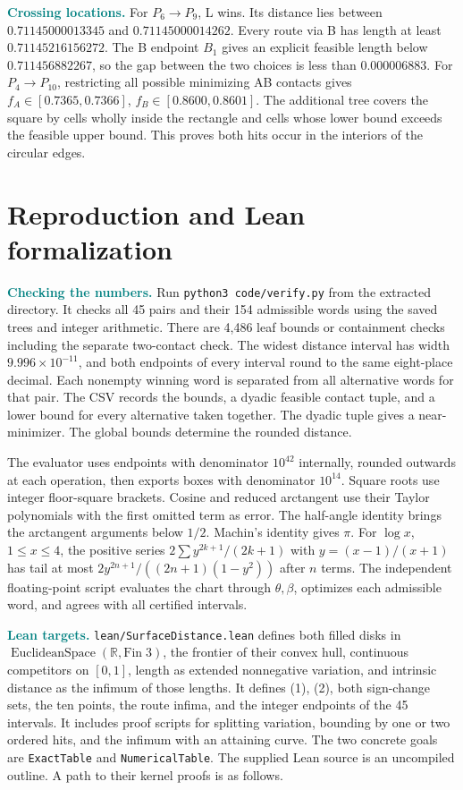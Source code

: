 \documentclass[11pt,letterpaper]{article}
\newcommand{\heading}[1]{\section*{\color{ink}#1}}
\newcommand{\para}[1]{\smallskip\noindent\textcolor{teal}{\textbf{#1}}\enspace}
\newcommand{\RR}{\mathbb R}
\begin{document}
\para{Crossing locations.} For $P_6\to P_9$, L wins. Its distance lies between $0.71145000013345$ and $0.71145000014262$. Every route via B has length at least $0.71145216156272$. The B endpoint $B_1$ gives an explicit feasible length below $0.711456882267$, so the gap between the two choices is less than $0.000006883$. For $P_4\to P_{10}$, restricting all possible minimizing AB contacts gives $f_A\in[0.7365,0.7366]$, $f_B\in[0.8600,0.8601]$. The additional tree covers the square by cells wholly inside the rectangle and cells whose lower bound exceeds the feasible upper bound. This proves both hits occur in the interiors of the circular edges.

\newpage
\heading{Reproduction and Lean formalization}
\para{Checking the numbers.} Run \texttt{python3 code/verify.py} from the extracted directory. It checks all 45 pairs and their 154 admissible words using the saved trees and integer arithmetic. There are 4{,}486 leaf bounds or containment checks including the separate two-contact check. The widest distance interval has width $9.996\times10^{-11}$, and both endpoints of every interval round to the same eight-place decimal. Each nonempty winning word is separated from all alternative words for that pair. The CSV records the bounds, a dyadic feasible contact tuple, and a lower bound for every alternative taken together. The dyadic tuple gives a near-minimizer. The global bounds determine the rounded distance.

The evaluator uses endpoints with denominator $10^{42}$ internally, rounded outwards at each operation, then exports boxes with denominator $10^{14}$. Square roots use integer floor-square brackets. Cosine and reduced arctangent use their Taylor polynomials with the first omitted term as error. The half-angle identity brings the arctangent arguments below $1/2$. Machin's identity gives $\pi$. For $\log x$, $1\le x\le4$, the positive series $2\sum y^{2k+1}/(2k+1)$ with $y=(x-1)/(x+1)$ has tail at most $2y^{2n+1}/((2n+1)(1-y^2))$ after $n$ terms. The independent floating-point script evaluates the chart through $\theta,\beta$, optimizes each admissible word, and agrees with all certified intervals.

\para{Lean targets.} \texttt{lean/SurfaceDistance.lean} defines both filled disks in $\operatorname{EuclideanSpace}(\RR,\mathrm{Fin}\;3)$, the frontier of their convex hull, continuous competitors on $[0,1]$, length as extended nonnegative variation, and intrinsic distance as the infimum of those lengths. It defines (1), (2), both sign-change sets, the ten points, the route infima, and the integer endpoints of the 45 intervals. It includes proof scripts for splitting variation, bounding by one or two ordered hits, and the infimum with an attaining curve. The two concrete goals are \texttt{ExactTable} and \texttt{NumericalTable}. The supplied Lean source is an uncompiled outline. A path to their kernel proofs is as follows.
\end{document}
